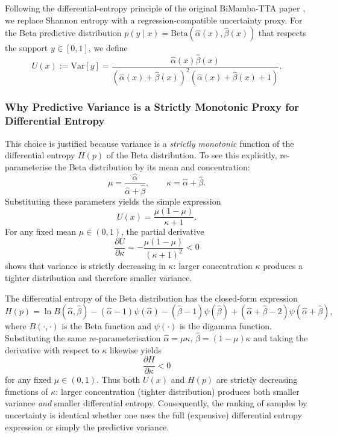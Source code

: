 \documentclass[11pt,a4paper]{article}
\begin{document}
	Following the differential-entropy principle of the original BiMamba-TTA paper \cite{ziyu2025}, we replace Shannon entropy with a regression-compatible uncertainty proxy.
	For the Beta predictive distribution $p(y \mid x) = \mathrm{Beta}(\hat{\alpha}(x),\hat{\beta}(x))$ that respects the support $y \in [0,1]$, we define
	$$
	U(x) := \mathrm{Var}[y] = \frac{\hat{\alpha}(x)\hat{\beta}(x)}{(\hat{\alpha}(x)+\hat{\beta}(x))^2(\hat{\alpha}(x)+\hat{\beta}(x)+1)}.
	$$
	
	\subsubsection{Why Predictive Variance is a Strictly Monotonic Proxy for Differential Entropy}
	
	This choice is justified because variance is a \emph{strictly monotonic} function of the differential entropy $H(p)$ of the Beta distribution.  
	To see this explicitly, re-parameterise the Beta distribution by its mean and concentration:
	$$
	\mu = \frac{\hat{\alpha}}{\hat{\alpha}+\hat{\beta}}, \qquad \kappa = \hat{\alpha} + \hat{\beta}.
	$$
	Substituting these parameters yields the simple expression
	$$
	U(x) = \frac{\mu(1-\mu)}{\kappa + 1}.
	$$
	For any fixed mean $\mu \in (0,1)$, the partial derivative
	$$
	\frac{\partial U}{\partial \kappa} = -\frac{\mu(1-\mu)}{(\kappa+1)^2} < 0
	$$
	shows that variance is strictly decreasing in $\kappa$: larger concentration $\kappa$ produces a tighter distribution and therefore smaller variance.
	
	The differential entropy of the Beta distribution has the closed-form expression
	$$
	H(p) = \ln B(\hat{\alpha},\hat{\beta}) - (\hat{\alpha}-1)\psi(\hat{\alpha}) - (\hat{\beta}-1)\psi(\hat{\beta}) + (\hat{\alpha}+\hat{\beta}-2)\psi(\hat{\alpha}+\hat{\beta}),
	$$
	where $B(\cdot,\cdot)$ is the Beta function and $\psi(\cdot)$ is the digamma function.  
	Substituting the same re-parameterisation $\hat{\alpha}=\mu\kappa$, $\hat{\beta}=(1-\mu)\kappa$ and taking the derivative with respect to $\kappa$ likewise yields
	$$
	\frac{\partial H}{\partial \kappa} < 0
	$$
	for any fixed $\mu \in (0,1)$. Thus both $U(x)$ and $H(p)$ are strictly decreasing functions of $\kappa$: larger concentration (tighter distribution) produces both smaller variance \emph{and} smaller differential entropy.  
	Consequently, the ranking of samples by uncertainty is identical whether one uses the full (expensive) differential entropy expression or simply the predictive variance.
	
\end{document}
